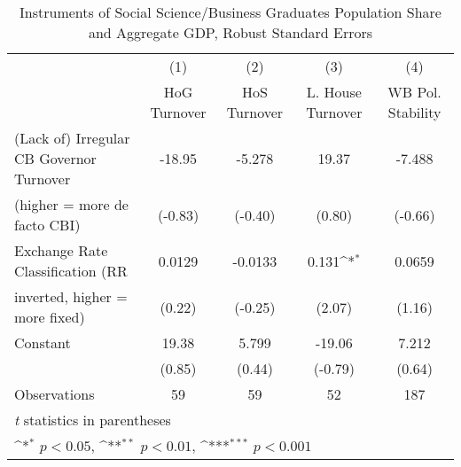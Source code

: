 \begin{table}[htbp]\centering
\def\sym#1{\ifmmode^{#1}\else\(^{#1}\)\fi}
\caption{Instruments of Social Science/Business Graduates Population Share and Aggregate GDP, Robust Standard Errors \label{ifivs4}}
\begin{tabular}{l*{4}{c}}
\toprule
                                        &\multicolumn{1}{c}{(1)}&\multicolumn{1}{c}{(2)}&\multicolumn{1}{c}{(3)}&\multicolumn{1}{c}{(4)}\\
                                        &\multicolumn{1}{c}{HoG Turnover}&\multicolumn{1}{c}{HoS Turnover}&\multicolumn{1}{c}{L. House Turnover}&\multicolumn{1}{c}{WB Pol. Stability}\\
\midrule
(Lack of) Irregular CB Governor Turnover&   -18.95         &   -5.278         &    19.37         &   -7.488         \\
(higher = more de facto CBI)            &  (-0.83)         &  (-0.40)         &   (0.80)         &  (-0.66)         \\
\addlinespace
Exchange Rate Classification (RR        &   0.0129         &  -0.0133         &    0.131\sym{*}  &   0.0659         \\
inverted, higher = more fixed)          &   (0.22)         &  (-0.25)         &   (2.07)         &   (1.16)         \\
\addlinespace
Constant                                &    19.38         &    5.799         &   -19.06         &    7.212         \\
                                        &   (0.85)         &   (0.44)         &  (-0.79)         &   (0.64)         \\
\midrule
Observations                            &       59         &       59         &       52         &      187         \\
\bottomrule
\multicolumn{5}{l}{\footnotesize \textit{t} statistics in parentheses}\\
\multicolumn{5}{l}{\footnotesize \sym{*} \(p<0.05\), \sym{**} \(p<0.01\), \sym{***} \(p<0.001\)}\\
\end{tabular}
\end{table}
